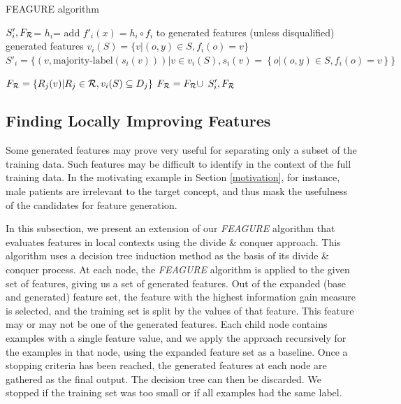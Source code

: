 \documentclass[twoside,11pt]{article}
\theoremstyle{definition}
\begin{document}
\begin{algorithm}[H]
	\caption{FEAGURE algorithm}
	\label{code-creating-prob}
	\small
	\begin{algorithmic}
		\State $S'_i,F_{\cal R}$=  %
		\State $h_i$=  
		\State add $f'_i(x)=h_i\circ f_i$ to generated features (unless disqualified)
		\EndFor
		\State \Return generated features
		\EndFunction
		\State 
		\State $v_i(S) = \{v | (o,y) \in S, f_{i}(o)=v\}$
		\State		$S'_i =  \{ (v, \mbox{majority-label}(s_i(v))) | v \in v_i(S),		 s_i(v)=\left \{o | (o,y)\in S, f_{i}(o)=v \right \}  \} $
		
		
		\State $F_{\cal R}=\{R_j(v)| R_j\in{\cal R}, v_i(S)\subseteq D_j\}$
		\State $F_{\cal R}=F_{\cal R}\cup$
		\EndIf
		\State \Return $S'_i, F_{\cal R}$ 
		\EndFunction
		
	\end{algorithmic}
\end{algorithm}

\subsection{Finding Locally Improving Features} \label{tree_usage}

Some generated features may prove very useful for separating only a subset of the training data. Such features may be difficult to identify in the context of the full training data. In the motivating example in Section \ref{motivation}, for instance, male patients are irrelevant to the target concept, and thus mask the usefulness of the candidates for feature generation.

In this subsection, we present an extension of our \emph{FEAGURE} algorithm that evaluates features in local contexts using the divide \& conquer approach.
This algorithm uses a decision tree induction method as the basis of its divide \& conquer process. At each node, the \emph{FEAGURE} algorithm is applied to the given set of features, giving us a set of generated features. Out of the expanded (base and generated) feature set, the feature with the highest information gain \cite{quinlan1986} measure is selected, and the training set is split by the values of that feature. This feature may or may not be one of the generated features. Each child node contains examples with a single feature value, and we apply the approach recursively for the examples in that node, using the expanded feature set as a baseline.
Once a stopping criteria has been reached, the generated features at each node are gathered as the final output. The decision tree can then be discarded.
We stopped if the training set was too small or if all examples had the same label.
\end{document}
